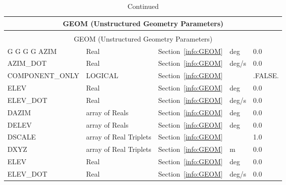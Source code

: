 \documentclass[12pt]{article}
\begin{document}
\begin{longtable}{@{\extracolsep{\fill}}|l|l|l|l|l|}
\caption[Unstructured geometry parameters ({\ct GEOM} namelist group)]{For more information see Section~\ref{info:GEOM}.}
\label{tbl:GEOM} \\
\hline
\multicolumn{5}{|c|}{{\ct GEOM} (Unstructured Geometry Parameters)} \\
\hline \hline
\endfirsthead
\caption[]{Continued} \\
\hline
\multicolumn{5}{|c|}{{\ct GEOM} (Unstructured Geometry Parameters)} \\
\hline \hline
\endhead
   G%
   G%
   G%
   G%
{\ct AZIM}         & Real                   & Section~\ref{info:GEOM}            &  deg      &    0.0                   \\ \hline
{\ct AZIM\_DOT}    & Real                   & Section~\ref{info:GEOM}            &  deg/s    &    0.0                   \\ \hline
{\ct COMPONENT\_ONLY} & LOGICAL             & Section~\ref{info:GEOM}            &           &  {\ct .FALSE.}           \\ \hline
{\ct ELEV}         & Real                   & Section~\ref{info:GEOM}            &  deg      &    0.0                   \\ \hline
{\ct ELEV\_DOT}    & Real                   & Section~\ref{info:GEOM}            &  deg/s    &    0.0                   \\ \hline
{\ct DAZIM}        & array of Reals         & Section~\ref{info:GEOM}            &  deg      &    0.0                   \\ \hline
{\ct DELEV}        & array of Reals         & Section~\ref{info:GEOM}            &  deg      &    0.0                   \\ \hline
{\ct DSCALE}       & array of Real Triplets & Section~\ref{info:GEOM}            &           &   1.0                    \\ \hline
{\ct DXYZ}         & array of Real Triplets & Section~\ref{info:GEOM}            &   m       &   0.0                    \\ \hline
{\ct ELEV}         & Real                   & Section~\ref{info:GEOM}            &  deg      &    0.0                   \\ \hline
{\ct ELEV\_DOT}    & Real                   & Section~\ref{info:GEOM}            &  deg/s    &    0.0                   \\ \hline

\end{longtable}
\end{document}
